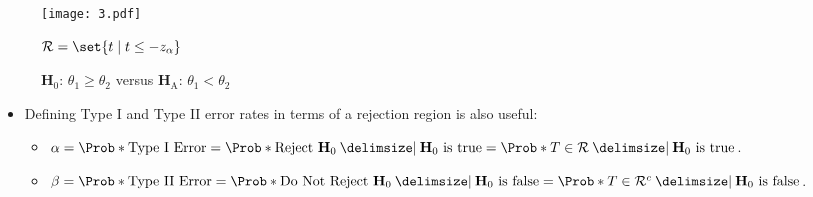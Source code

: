 \begin{figure}[!htbp]
    \centering
    \texttt{[image: 3.pdf]}
    \caption{$ \mathbf{H}_0 $: $ \theta_1\ge\theta_2 $ versus $ \mathbf{H}_\text{A} $: $ \theta_1<\theta_2 $}{$ \mathcal{R}=\set{t\mid t\le -z_{\alpha}} $}
\end{figure}
\begin{itemize}
    \item Defining Type I and Type II error rates in terms of a rejection region is also useful:
          \begin{itemize}
              \item $ \alpha=\Prob*{\text{Type I Error}}=\Prob*{\text{Reject $ \mathbf{H}_0 $}\given \text{$ \mathbf{H}_0 $ is true}}=\Prob*{T\in\mathcal{R}\given \text{$ \mathbf{H}_0 $ is true}} $.
              \item $ \beta=\Prob*{\text{Type II Error}}=\Prob*{\text{Do Not Reject $ \mathbf{H}_0 $}\given \text{$ \mathbf{H}_0 $ is false}}=\Prob*{T\in\mathcal{R}^c\given \text{$ \mathbf{H}_0 $ is false}} $.
          \end{itemize}
\end{itemize}
